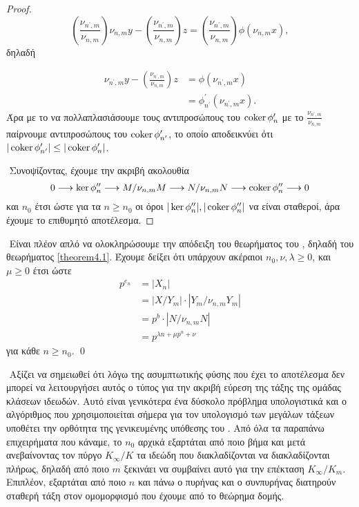 \begin{proof}
$$\left( \frac{\nu_{n^\prime,m}}{\nu_{n,m}}\right) \nu_{n,m}y - \left( \frac{\nu_{n^\prime,m}}{\nu_{n,m}}\right)z = \left( \frac{\nu_{n^\prime,m}}{\nu_{n,m}}\right)\phi(\nu_{n,m}x) ,$$ δηλαδή

\begin{align*}
\nu_{n^\prime,m}y - \left( \frac{\nu_{n^\prime,m}}{\nu_{n,m}}\right)z &=\phi(\nu_{n^\prime,m}x) \\
&= \phi^\prime_{n^\prime}(\nu_{n^\prime,m}x) .
\end{align*} Άρα με το να πολλαπλασιάσουμε τους αντιπροσώπους του $\operatorname{coker}\phi^\prime_n$ με το $\frac{\nu_{n^\prime,m}}{\nu_{n,m}}$ παίρνουμε αντιπροσώπους του $\operatorname{coker}\phi^\prime_{n^\prime}$, το οποίο αποδεικνύει ότι $|\operatorname{coker}\phi^\prime_{n^\prime}| \leq |\operatorname{coker}\phi^\prime_n|$.

$ $\newline
Συνοψίζοντας, έχουμε την ακριβή ακολουθία
$$0\longrightarrow \ker\phi^{\prime\prime}_n \longrightarrow M/\nu_{n,m}M \longrightarrow N/\nu_{n,m}N \longrightarrow \operatorname{coker}\phi^{\prime\prime}_n \longrightarrow 0$$
και $n_0$ έτσι ώστε για τα $n\geq n_0$ οι όροι $|\ker\phi^{\prime\prime}_n|, |\operatorname{coker}\phi^{\prime\prime}_n|$ να είναι σταθεροί, άρα έχουμε το επιθυμητό αποτέλεσμα.

\end{proof}

$ $\newline
Είναι πλέον απλό να ολοκληρώσουμε την απόδειξη του θεωρήματος του , δηλαδή του θεωρήματος \ref{theorem4.1}. Έχουμε δείξει ότι υπάρχουν ακέραιοι $n_0,\nu,\lambda\geq 0$, και $\mu\geq 0$ έτσι ώστε 
\begin{align*}
    p^{e_n} &= |X_n| \\
    &= |X/Y_m|\cdot |Y_m/\nu_{n,m}Y_m| \\
    &=p^b \cdot |N/\nu_{n,m}N| \\ 
    &= p^{\lambda n + \mu p^n + \nu}
\end{align*} για κάθε $n\geq n_0$. \qed

$ $\newline
Αξίζει να σημειωθεί ότι λόγω της ασυμπτωτικής φύσης που έχει το αποτέλεσμα δεν μπορεί να λειτουργήσει 
αυτός ο τύπος για την ακριβή εύρεση της τάξης της ομάδας κλάσεων ιδεωδών. Αυτό είναι γενικότερα ένα δύσκολο πρόβλημα 
υπολογιστικά και ο αλγόριθμος που χρησιμοποιείται σήμερα για τον υπολογισμό των μεγάλων τάξεων υποθέτει την ορθότητα της γενικευμένης 
υπόθεσης του  \cite{Lmfdb}. Από όλα τα παραπάνω επιχειρήματα που κάναμε, το $n_0$ αρχικά εξαρτάται από ποιο βήμα και μετά ανεβαίνοντας τον πύργο $K_\infty/K$ τα ιδεώδη που διακλαδίζονται να διακλαδίζονται πλήρως, δηλαδή από ποιο $m$ ξεκινάει να συμβαίνει αυτό για την επέκταση $K_\infty/K_m$. 
Επιπλέον, εξαρτάται από ποιο $n$ και πάνω ο πυρήνας και ο συνπυρήνας διατηρούν σταθερή τάξη στον ομομορφισμό που έχουμε από το θεώρημα 
δομής.

